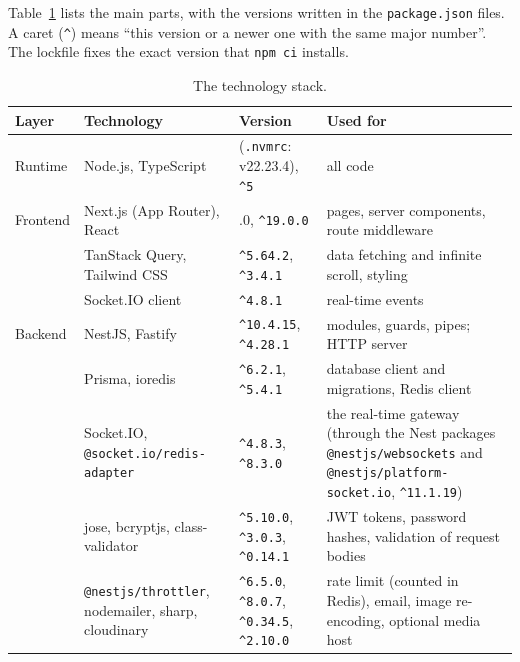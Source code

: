 Table~\ref{tab:impl-stack} lists the main parts, with the versions written in the \texttt{package.json} files. A caret (\texttt{\textasciicircum}) means ``this version or a newer one with the same major number''. The lockfile fixes the exact version that \texttt{npm ci} installs.

\begin{table}[htb]
  \centering
  \caption{The technology stack.}
  \label{tab:impl-stack}
  \footnotesize
  \renewcommand{\arraystretch}{1.15}
  \begin{tabularx}{\textwidth}{@{}l >{\raggedright\arraybackslash}p{4.3cm} >{\raggedright\arraybackslash}p{3.4cm} >{\raggedright\arraybackslash}X@{}}
    \toprule
    Layer & Technology & Version & Used for \\
    \midrule
    Runtime  & Node.js, TypeScript & 22 (\texttt{.nvmrc}: v22.23.4), \texttt{\textasciicircum 5} & all code \\
    \midrule
    Frontend & Next.js (App Router), React & 15.1.0, \texttt{\textasciicircum 19.0.0} & pages, server components, route middleware \\
             & TanStack Query, Tailwind CSS & \texttt{\textasciicircum 5.64.2}, \texttt{\textasciicircum 3.4.1} & data fetching and infinite scroll, styling \\
             & Socket.IO client & \texttt{\textasciicircum 4.8.1} & real-time events \\
    \midrule
    Backend  & NestJS, Fastify & \texttt{\textasciicircum 10.4.15}, \texttt{\textasciicircum 4.28.1} & modules, guards, pipes; HTTP server \\
             & Prisma, ioredis & \texttt{\textasciicircum 6.2.1}, \texttt{\textasciicircum 5.4.1} & database client and migrations, Redis client \\
             & Socket.IO, \texttt{@socket.io/\allowbreak redis-adapter} & \texttt{\textasciicircum 4.8.3}, \texttt{\textasciicircum 8.3.0} & the real-time gateway (through the Nest packages \texttt{@nestjs/\allowbreak websockets} and \texttt{@nestjs/\allowbreak platform-socket.io}, \texttt{\textasciicircum 11.1.19}) \\
             & jose, bcryptjs, class-validator & \texttt{\textasciicircum 5.10.0}, \texttt{\textasciicircum 3.0.3}, \texttt{\textasciicircum 0.14.1} & JWT tokens, password hashes, validation of request bodies \\
             & \texttt{@nestjs/\allowbreak throttler}, nodemailer, sharp, cloudinary & \texttt{\textasciicircum 6.5.0}, \texttt{\textasciicircum 8.0.7}, \texttt{\textasciicircum 0.34.5}, \texttt{\textasciicircum 2.10.0} & rate limit (counted in Redis), email, image re-encoding, optional media host \\

\end{tabularx}
\end{table}
